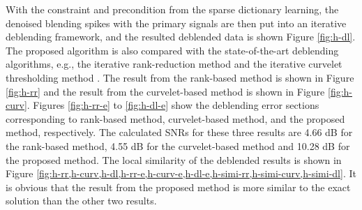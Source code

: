 With the constraint and precondition from the sparse dictionary learning, the denoised blending spikes with the primary signals are then put into an iterative deblending framework, and the resulted deblended data is shown Figure \ref{fig:h-dl}. The proposed algorithm is also compared with the state-of-the-art deblending algorithms, e.g., the iterative rank-reduction method \cite[]{jinkun2015} and the iterative curvelet thresholding method \cite[]{shaohuan20161}. The result from the rank-based method is shown in Figure \ref{fig:h-rr} and the result from the curvelet-based method is shown in Figure \ref{fig:h-curv}. Figures \ref{fig:h-rr-e}  to \ref{fig:h-dl-e} show the deblending error sections corresponding to rank-based method, curvelet-based method, and the proposed method, respectively. The calculated SNRs for these three results are 4.66 dB for the rank-based method, 4.55 dB for the curvelet-based method and 10.28 dB for the proposed method. The local similarity of the deblended results is shown in  Figure \ref{fig:h-rr,h-curv,h-dl,h-rr-e,h-curv-e,h-dl-e,h-simi-rr,h-simi-curv,h-simi-dl}. It is obvious that the result from the proposed method is more similar to the exact solution than the other two results.

